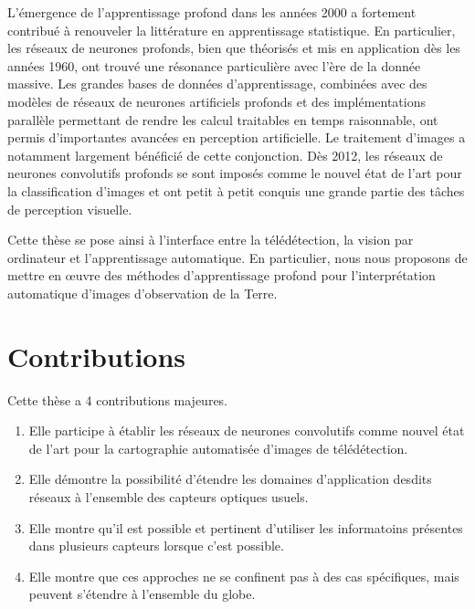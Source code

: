 L'émergence de l'apprentissage profond dans les années 2000 a fortement contribué à renouveler la littérature en apprentissage statistique. En particulier, les réseaux de neurones profonds, bien que théorisés et mis en application dès les années 1960, ont trouvé une résonance particulière avec l'ère de la donnée massive. Les grandes bases de données d'apprentissage, combinées avec des modèles de réseaux de neurones artificiels profonds et des implémentations parallèle permettant de rendre les calcul traitables en temps raisonnable, ont permis d'importantes avancées en perception artificielle. Le traitement d'images a notamment largement bénéficié de cette conjonction. Dès 2012, les réseaux de neurones convolutifs profonds se sont imposés comme le nouvel état de l'art pour la classification d'images et ont petit à petit conquis une grande partie des tâches de perception visuelle.

Cette thèse se pose ainsi à l'interface entre la télédétection, la vision par ordinateur et l'apprentissage automatique. En particulier, nous nous proposons de mettre en \oe{}uvre des méthodes d'apprentissage profond pour l'interprétation automatique d'images d'observation de la Terre.


\section{Contributions}

Cette thèse a 4 contributions majeures.
\begin{enumerate}
  \item Elle participe à établir les réseaux de neurones convolutifs comme nouvel état de l'art pour la cartographie automatisée d'images de télédétection.
  \item Elle démontre la possibilité d'étendre les domaines d'application desdits réseaux à l'ensemble des capteurs optiques usuels.
  \item Elle montre qu'il est possible et pertinent d'utiliser les informatoins présentes dans plusieurs capteurs lorsque c'est possible.
  \item Elle montre que ces approches ne se confinent pas à des cas spécifiques, mais peuvent s'étendre à l'ensemble du globe.
\end{enumerate}

%
%
